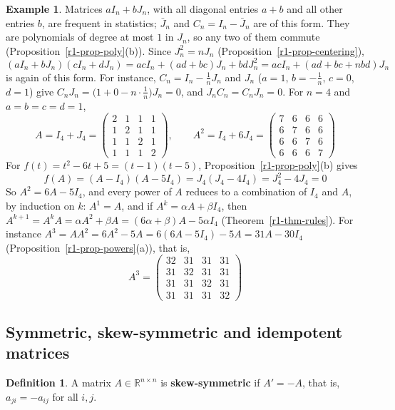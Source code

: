 \documentclass[12pt]{article}
\newcommand{\R}{\mathbb R}
\theoremstyle{definition}
\newtheorem{definition}[theorem]{Definition}
\newtheorem{example}[theorem]{Example}
\begin{document}
\begin{example}\label{r1-exm-poly}
Matrices \(aI_n+bJ_n\), with all diagonal entries \(a+b\) and all other entries \(b\), are frequent in statistics;
\(\bar J_n\) and \(C_n=I_n-\bar J_n\) are of this form. They are polynomials of degree at most \(1\) in \(J_n\), so any
two of them commute (Proposition~\ref{r1-prop-poly}(b)). Since \(J_n^2=nJ_n\) (Proposition~\ref{r1-prop-centering}),
\[
(aI_n+bJ_n)(cI_n+dJ_n)=acI_n+(ad+bc)J_n+bdJ_n^2=acI_n+(ad+bc+nbd)J_n
\]
is again of this form. For instance, \(C_n=I_n-\frac1nJ_n\) and \(J_n\) (\(a=1\), \(b=-\frac1n\), \(c=0\), \(d=1\))
give \(C_nJ_n=\bigl(1+0-n\cdot\frac1n\bigr)J_n=0\), and \(J_nC_n=C_nJ_n=0\). For \(n=4\) and \(a=b=c=d=1\),
\[
A=I_4+J_4=\begin{pmatrix}2&1&1&1\\1&2&1&1\\1&1&2&1\\1&1&1&2\end{pmatrix},\qquad
A^2=I_4+6J_4=\begin{pmatrix}7&6&6&6\\6&7&6&6\\6&6&7&6\\6&6&6&7\end{pmatrix}
\]
For \(f(t)=t^2-6t+5=(t-1)(t-5)\), Proposition~\ref{r1-prop-poly}(b) gives
\[
f(A)=(A-I_4)(A-5I_4)=J_4(J_4-4I_4)=J_4^2-4J_4=0
\]
So \(A^2=6A-5I_4\), and every power of \(A\) reduces to a combination of \(I_4\) and \(A\), by induction on \(k\):
\(A^1=A\), and if \(A^k=\alpha A+\beta I_4\), then \(A^{k+1}=A^kA=\alpha A^2+\beta A=(6\alpha+\beta)A-5\alpha I_4\)
(Theorem~\ref{r1-thm-rules}). For instance
\(A^3=AA^2=6A^2-5A=6(6A-5I_4)-5A=31A-30I_4\) (Proposition~\ref{r1-prop-powers}(a)), that is,
\[
A^3=\begin{pmatrix}32&31&31&31\\31&32&31&31\\31&31&32&31\\31&31&31&32\end{pmatrix}
\]
\end{example}

\subsection*{Symmetric, skew-symmetric and idempotent matrices}

\begin{definition}\label{r1-def-skew}
A matrix \(A\in\R^{n\times n}\) is \textbf{skew-symmetric} if \(A'=-A\), that is, \(a_{ji}=-a_{ij}\) for all \(i,j\).
\end{definition}
\end{document}
